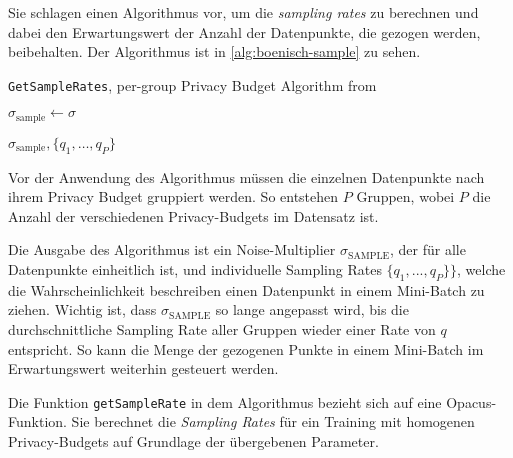 Sie schlagen einen Algorithmus vor, um die \textit{sampling rates} zu berechnen und dabei den Erwartungswert der Anzahl der Datenpunkte, die gezogen werden, beibehalten. Der Algorithmus ist in \autoref{alg:boenisch-sample} zu sehen.

\begin{algorithm}[tb]
	\caption{\texttt{GetSampleRates}, per-group Privacy Budget Algorithm from \cite[p.6]{boenisch:2023}}
	\label{alg:boenisch-sample}
	
	
	\BlankLine
	$\sigma_\text{sample} \leftarrow \sigma$
	
	\KwRet $\sigma_\text{sample}, \{q_1, \dots, q_P\}$\;
\end{algorithm}

Vor der Anwendung des Algorithmus müssen die einzelnen Datenpunkte nach ihrem Privacy Budget gruppiert werden. So entstehen $P$ Gruppen, wobei $P$ die Anzahl der verschiedenen Privacy-Budgets im Datensatz ist.

Die Ausgabe des Algorithmus ist ein Noise-Multiplier $\sigma_{\text{SAMPLE}}$, der für alle Datenpunkte einheitlich ist, und individuelle Sampling Rates $\{q_1, ..., q_P\}\}$, welche die Wahrscheinlichkeit beschreiben einen Datenpunkt in einem Mini-Batch zu ziehen. Wichtig ist, dass $\sigma_{\text{SAMPLE}}$ so lange angepasst wird, bis die durchschnittliche Sampling Rate aller Gruppen wieder einer Rate von $q$ entspricht. So kann die Menge der gezogenen Punkte in einem Mini-Batch im Erwartungswert weiterhin gesteuert werden.

Die Funktion \texttt{getSampleRate} in dem Algorithmus bezieht sich auf eine Opacus\cite{yousefpour:2021}-Funktion. Sie berechnet die \textit{Sampling Rates} für ein Training mit homogenen Privacy-Budgets auf Grundlage der übergebenen Parameter.

